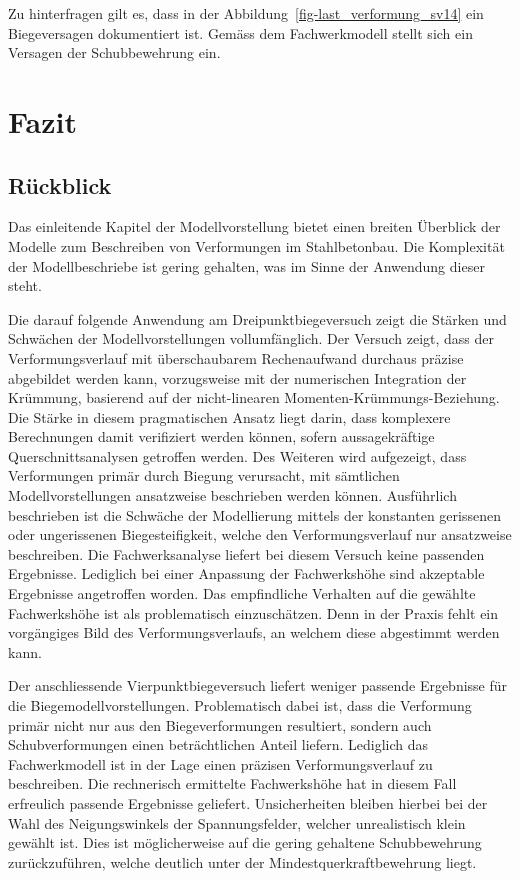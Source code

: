 \documentclass[
  12pt,
  letterpaper,
  egregdoesnotlikesansseriftitles]{scrreprt}
\begin{document}
Zu hinterfragen gilt es, dass in der
Abbildung~\ref{fig-last_verformung_sv14} ein Biegeversagen dokumentiert
ist. Gemäss dem Fachwerkmodell stellt sich ein Versagen der
Schubbewehrung ein.


\hypertarget{fazit}{%
\chapter{Fazit}\label{fazit}}

\hypertarget{ruxfcckblick}{%
\section{Rückblick}\label{ruxfcckblick}}

Das einleitende Kapitel der Modellvorstellung bietet einen breiten
Überblick der Modelle zum Beschreiben von Verformungen im Stahlbetonbau.
Die Komplexität der Modellbeschriebe ist gering gehalten, was im Sinne
der Anwendung dieser steht.

Die darauf folgende Anwendung am Dreipunktbiegeversuch zeigt die Stärken
und Schwächen der Modellvorstellungen vollumfänglich. Der Versuch zeigt,
dass der Verformungsverlauf mit überschaubarem Rechenaufwand durchaus
präzise abgebildet werden kann, vorzugsweise mit der numerischen
Integration der Krümmung, basierend auf der nicht-linearen
Momenten-Krümmungs-Beziehung. Die Stärke in diesem pragmatischen Ansatz
liegt darin, dass komplexere Berechnungen damit verifiziert werden
können, sofern aussagekräftige Querschnittsanalysen getroffen werden.
Des Weiteren wird aufgezeigt, dass Verformungen primär durch Biegung
verursacht, mit sämtlichen Modellvorstellungen ansatzweise beschrieben
werden können. Ausführlich beschrieben ist die Schwäche der Modellierung
mittels der konstanten gerissenen oder ungerissenen Biegesteifigkeit,
welche den Verformungsverlauf nur ansatzweise beschreiben. Die
Fachwerksanalyse liefert bei diesem Versuch keine passenden Ergebnisse.
Lediglich bei einer Anpassung der Fachwerkshöhe sind akzeptable
Ergebnisse angetroffen worden. Das empfindliche Verhalten auf die
gewählte Fachwerkshöhe ist als problematisch einzuschätzen. Denn in der
Praxis fehlt ein vorgängiges Bild des Verformungsverlaufs, an welchem
diese abgestimmt werden kann.

Der anschliessende Vierpunktbiegeversuch liefert weniger passende
Ergebnisse für die Biegemodellvorstellungen. Problematisch dabei ist,
dass die Verformung primär nicht nur aus den Biegeverformungen
resultiert, sondern auch Schubverformungen einen beträchtlichen Anteil
liefern. Lediglich das Fachwerkmodell ist in der Lage einen präzisen
Verformungsverlauf zu beschreiben. Die rechnerisch ermittelte
Fachwerkshöhe hat in diesem Fall erfreulich passende Ergebnisse
geliefert. Unsicherheiten bleiben hierbei bei der Wahl des
Neigungswinkels der Spannungsfelder, welcher unrealistisch klein gewählt
ist. Dies ist möglicherweise auf die gering gehaltene Schubbewehrung
zurückzuführen, welche deutlich unter der Mindestquerkraftbewehrung
liegt.
\end{document}
